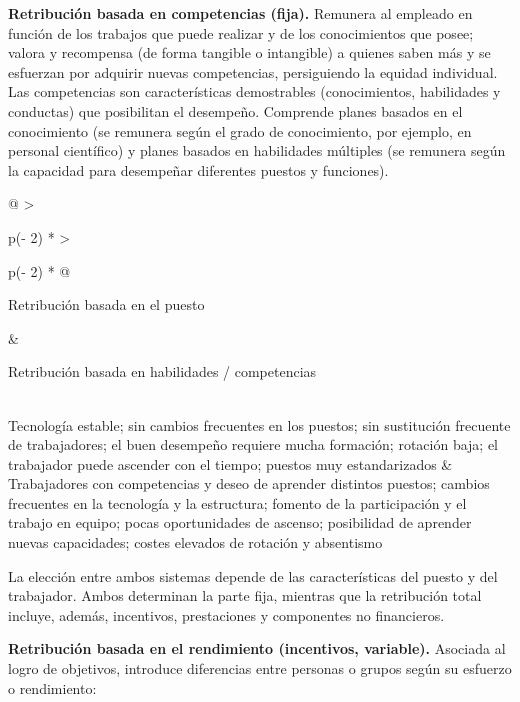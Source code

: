 \documentclass[12pt]{book} %
\begin{document}
\textbf{Retribución basada en competencias (fija).} Remunera al empleado
en función de los trabajos que puede realizar y de los conocimientos que
posee; valora y recompensa (de forma tangible o intangible) a quienes
saben más y se esfuerzan por adquirir nuevas competencias, persiguiendo
la equidad individual. Las competencias son características demostrables
(conocimientos, habilidades y conductas) que posibilitan el desempeño.
Comprende planes basados en el conocimiento (se remunera según el grado
de conocimiento, por ejemplo, en personal científico) y planes basados
en habilidades múltiples (se remunera según la capacidad para desempeñar
diferentes puestos y funciones).

\begin{longtable}[]{@{}
  >{\raggedright\arraybackslash}p{(\columnwidth - 2\tabcolsep) * }
  >{\raggedright\arraybackslash}p{(\columnwidth - 2\tabcolsep) * }@{}}
\toprule\noalign{}
\begin{minipage}[b]{\linewidth}\raggedright
Retribución basada en el puesto
\end{minipage} & \begin{minipage}[b]{\linewidth}\raggedright
Retribución basada en habilidades / competencias
\end{minipage} \\
\midrule\noalign{}
\endhead
\bottomrule\noalign{}
\endlastfoot
Tecnología estable; sin cambios frecuentes en los puestos; sin
sustitución frecuente de trabajadores; el buen desempeño requiere mucha
formación; rotación baja; el trabajador puede ascender con el tiempo;
puestos muy estandarizados & Trabajadores con competencias y deseo de
aprender distintos puestos; cambios frecuentes en la tecnología y la
estructura; fomento de la participación y el trabajo en equipo; pocas
oportunidades de ascenso; posibilidad de aprender nuevas capacidades;
costes elevados de rotación y absentismo \\
\end{longtable}

La elección entre ambos sistemas depende de las características del
puesto y del trabajador. Ambos determinan la parte fija, mientras que la
retribución total incluye, además, incentivos, prestaciones y
componentes no financieros.

\textbf{Retribución basada en el rendimiento (incentivos, variable).}
Asociada al logro de objetivos, introduce diferencias entre personas o
grupos según su esfuerzo o rendimiento:
\end{document}
